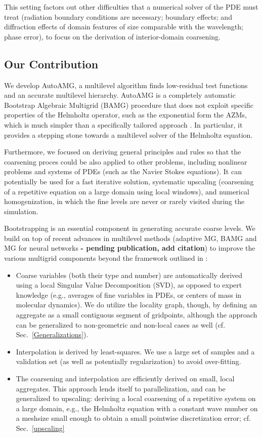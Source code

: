 \documentclass{article}
\begin{document}
This setting factors out other difficulties that a numerical solver of the PDE must treat (radiation boundary conditions are necessary; boundary effects; and diffraction effects of domain features of size comparable with the wavelength; phase error), to focus on the derivation of interior-domain coarsening.

\subsection{Our Contribution}
We develop AutoAMG, a multilevel algorithm finds low-residual test functions and an accurate multilevel hierarchy. AutoAMG is a completely automatic Bootstrap Algebraic Multigrid (BAMG) procedure that does not exploit specific properties of the Helmholtz operator, such as the exponential form the AZMs, which is much simpler than a specifically tailored approach  \cite{wave_ray, later_papers}. In particular, it provides a stepping stone towards a multilevel  solver of the Helmholtz equation.

Furthermore, we focused on deriving general principles and rules so that the coarsening proces could be also applied to other problems, including nonlinear problems and systems of PDEs (such as the Navier Stokes equations). It can potentially be used for a fast iterative solution, systematic upscaling (coarsening of a repetitive equation on a large domain using local windows), and numerical homogenization, in which the fine levels are never or rarely visited during the simulation.

Bootstrapping is an essential component in generating accurate coarse levels. We build on top of recent advances in multilevel methods (adaptive MG, BAMG \cite{bamg, lamg, mg_guide} and MG for neural networks \textbf{- pending publication, add citation}) to improve the various multigrid components beyond the framework outlined in \cite{su}:
\begin{itemize}
	\item Coarse variables (both their type and number) are automatically derived using a local Singular Value Decomposition (SVD), as opposed to expert knowledge (e.g., averages of fine variables in PDEs, or centers of mass in molecular dynamics). We do utilize the locality graph, though, by defining an aggregate as a small contiguous segment of gridpoints, although the approach can be generalized to non-geometric and non-local cases as well (cf. Sec.~\ref{Generalizations}).
	\item Interpolation is derived by least-squares. We use a large set of samples and a validation set (as well as potentially regularization) to avoid over-fitting.
	\item The coarsening and interpolation are efficiently derived on small, local aggregates. This approach lends itself to parallelization, and can be generalized to upscaling: deriving a local coarsening of a repetitive system on a large domain, e.g., the Helmholtz equation with a constant wave number on a meshsize small enough to obtain a small pointwise discretization error; cf. Sec.~\ref{upscaling}
\end{itemize}
\end{document}
